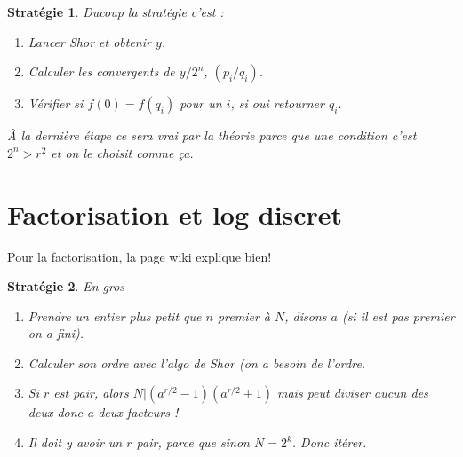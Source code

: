 \documentclass[a4paper,12pt]{book}
\theoremstyle{plain}
\newtheorem{strat}{Stratégie}
\theoremstyle{definition}
\theoremstyle{remark}
\begin{document}
\begin{strat}
    Ducoup la stratégie c'est : 
    \begin{enumerate}
        \item Lancer Shor et obtenir $y$.
        \item Calculer les convergents de $y/2^n$, $(p_i/q_i)$.
        \item Vérifier si $f(0)=f(q_i)$ pour un $i$, si oui
            retourner $q_i$.
    \end{enumerate}
    À la dernière étape ce sera vrai par la théorie parce que une
    condition c'est $2^n>r^2$ et on le choisit comme ça.
\end{strat}

\section{Factorisation et log discret}
Pour la factorisation, la page wiki explique bien!
\begin{strat}
    En gros
    \begin{enumerate}
        \item Prendre un entier plus petit que $n$ premier à $N$, 
    disons $a$ (si il est pas premier on a fini).
        \item Calculer son ordre avec l'algo de Shor (on a besoin de 
            l'ordre.
        \item Si $r$ est pair, alors $N|(a^{r/2}-1)(a^{r/2}+1)$
            mais peut diviser aucun des deux donc a deux facteurs !
        \item Il doit y avoir un $r$ pair, parce que sinon $N=2^k$.
            Donc itérer.
    \end{enumerate}
\end{strat}
\end{document}
